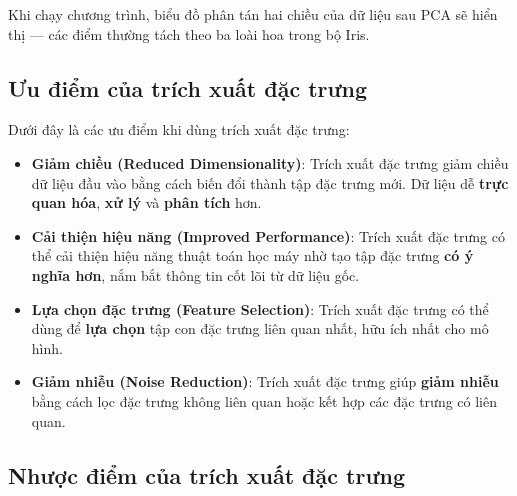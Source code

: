 \begin{ynghia}[title={Kết quả đầu ra}]
Khi chạy chương trình, biểu đồ phân tán hai chiều của dữ liệu sau PCA sẽ hiển thị --- các điểm thường tách theo ba loài hoa trong bộ Iris.
\end{ynghia}

\begin{vidu}[title={Hình minh họa kết quả}]
\end{vidu}

\subsection{Ưu điểm của trích xuất đặc trưng}

\begin{tinhchat}[title={Ưu điểm}]
Dưới đây là các ưu điểm khi dùng trích xuất đặc trưng:
\begin{itemize}
  \item \textbf{Giảm chiều (Reduced Dimensionality)}: Trích xuất đặc trưng giảm chiều dữ liệu đầu vào bằng cách biến đổi thành tập đặc trưng mới. Dữ liệu dễ \textbf{trực quan hóa}, \textbf{xử lý} và \textbf{phân tích} hơn.
  \item \textbf{Cải thiện hiệu năng (Improved Performance)}: Trích xuất đặc trưng có thể cải thiện hiệu năng thuật toán học máy nhờ tạo tập đặc trưng \textbf{có ý nghĩa hơn}, nắm bắt thông tin cốt lõi từ dữ liệu gốc.
  \item \textbf{Lựa chọn đặc trưng (Feature Selection)}: Trích xuất đặc trưng có thể dùng để \textbf{lựa chọn} tập con đặc trưng liên quan nhất, hữu ích nhất cho mô hình.
  \item \textbf{Giảm nhiễu (Noise Reduction)}: Trích xuất đặc trưng giúp \textbf{giảm nhiễu} bằng cách lọc đặc trưng không liên quan hoặc kết hợp các đặc trưng có liên quan.
\end{itemize}
\end{tinhchat}

\subsection{Nhược điểm của trích xuất đặc trưng}

